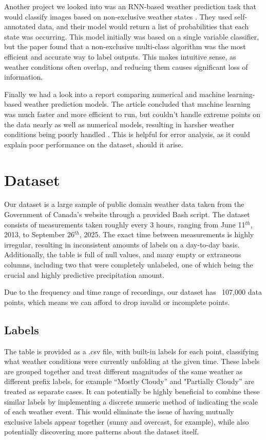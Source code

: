 \documentclass[11pt]{article}
\begin{document}
Another project we looked into was an RNN-based weather prediction task that would classify images based on non-exclusive weather states \citep{zhao2019cnnrnnarchitecturemultilabelweather}. They used self-annotated data, and their model would return a list of probabilities that each state was occurring. This model initially was based on a single variable classifier, but the paper found that a non-exclusive multi-class algorithm was the most efficient and accurate way to label outputs. This makes intuitive sense, as weather conditions often overlap, and reducing them causes significant loss of information.

Finally we had a look into a report comparing numerical and machine learning-based weather prediction models. The article concluded that machine learning was much faster and more efficient to run, but couldn’t handle extreme points on the data nearly as well as numerical models, resulting in harsher weather conditions being poorly handled \citep{WAQAS2025306}. This is helpful for error analysis, as it could explain poor performance on the dataset, should it arise.

\section{Dataset} %

Our dataset is a large sample of public domain weather data taken from the Government of Canada’s website through a provided Bash script. The dataset consists of measurements taken roughly every 3 hours, ranging from June 11$^{th}$, 2013, to September 26$^{th}$, 2025. The exact time between measurements is highly irregular, resulting in inconsistent amounts of labels on a day-to-day basis. Additionally, the table is full of null values, and many empty or extraneous columns, including two that were completely unlabeled, one of which being the crucial and highly predictive precipitation amount.

Due to the frequency and time range of recordings, our dataset has ~107,000 data points, which means we can afford to drop invalid or incomplete points.

\subsection{Labels} %

The table is provided as a .csv file, with built-in labels for each point, classifying what weather conditions were currently unfolding at the given time. These labels are grouped together and treat different magnitudes of the same weather as different prefix labels, for example “Mostly Cloudy” and "Partially Cloudy” are treated as separate cases. It can potentially be highly beneficial  to combine these similar labels by implementing a discrete numeric method of indicating the scale of each weather event. This would eliminate the issue of having mutually exclusive labels appear together (sunny and overcast, for example), while also potentially discovering more patterns about the dataset itself.
\end{document}
